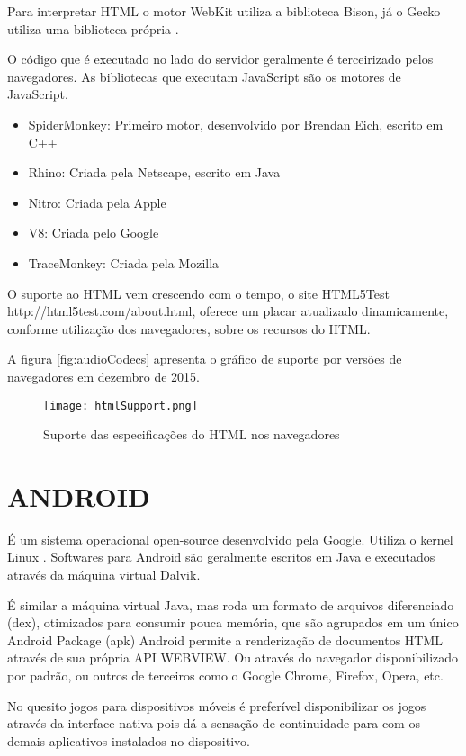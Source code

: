 Para interpretar HTML o motor WebKit utiliza a biblioteca Bison, já o
Gecko utiliza uma biblioteca própria \autocite{howBrowsersWork}.

O código que é executado no lado do servidor geralmente é terceirizado pelos navegadores.
As bibliotecas que executam JavaScript são os motores de JavaScript.

\begin{itemize}
    \item SpiderMonkey: Primeiro motor, desenvolvido por Brendan Eich, escrito em C++
    \item Rhino: Criada pela Netscape, escrito em Java
    \item Nitro: Criada pela Apple
    \item V8: Criada pelo Google
    \item TraceMonkey: Criada pela Mozilla
\end{itemize}

O suporte ao HTML vem crescendo com o tempo, o site HTML5Test
http://html5test.com/about.html, oferece um placar atualizado
dinamicamente, conforme utilização dos navegadores, sobre os recursos
do HTML.

A figura \ref{fig:audioCodecs} apresenta o gráfico de suporte por
versões de navegadores em dezembro de 2015.

\begin{figure}
    \centering
    \texttt{[image: htmlSupport.png]}
	\caption{Suporte das especificações do HTML nos navegadores}
    \label{fig:htmlSupport}
\end{figure}

\section{ANDROID}
\begin{draft}
É um sistema operacional open-source desenvolvido pela Google. Utiliza
o kernel Linux . Softwares para Android são geralmente escritos em Java
e executados através da máquina virtual Dalvik.

É similar a máquina virtual Java, mas roda um formato de arquivos
diferenciado (dex), otimizados para consumir pouca memória, que
são agrupados em um único Android Package (apk) Android permite a
renderização de documentos HTML através de sua própria API WEBVIEW.
Ou através do navegador disponibilizado por padrão, ou outros de
terceiros como o Google Chrome, Firefox, Opera, etc.

No quesito jogos para dispositivos móveis é preferível disponibilizar
os jogos através da interface nativa pois dá a sensação de
continuidade para com os demais aplicativos instalados no dispositivo.
\end{draft}

